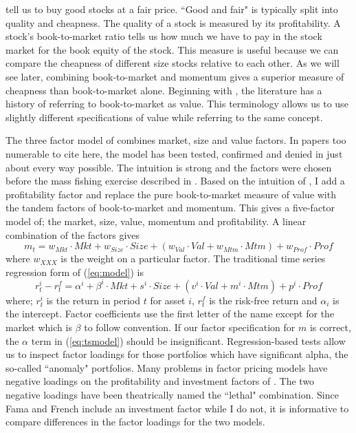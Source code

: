\textcite{graham1934security} tell us to buy good stocks at a fair price.
``Good and fair" is typically split into quality and cheapness.
The quality of a stock is measured by its profitability.
A stock's book-to-market ratio tells us how much we have to pay in the stock 
market for the book equity of the stock.
This measure is useful because we can compare the cheapness of 
different size stocks relative to each other.
As we will see later, combining book-to-market and momentum gives a superior 
measure of cheapness than book-to-market alone.
Beginning with \textcite{fama1992cross}, the literature has a history of 
referring to book-to-market as value.
This terminology allows us to use slightly different specifications of 
value while referring to the same concept.

The three factor model of \textcite{fama1993common} combines market, size and
value factors.
In papers too numerable to cite here, the model has been tested, confirmed and
denied in just about every way possible.
The intuition is strong and the factors were chosen before the mass fishing 
exercise described in \textcite{harvey2016and}.
Based on the intuition of \textcite{graham1934security}, I add a profitability 
factor and replace the pure book-to-market measure of
value with the tandem factors of book-to-market and momentum.
This gives a five-factor model of; the market, size, value, momentum and
profitability. A linear combination of the factors gives
\begin{equation}
\label{eq:model}
m_t= w_{Mkt} \cdot Mkt + w_{Size} \cdot Size +
\left( w_{Val} \cdot Val + w_{Mtm} \cdot Mtm \right) + 
w_{Prof} \cdot Prof
\end{equation}
where $w_{XXX}$ is the weight on a particular factor.
The traditional time series regression form of (\ref{eq:model}) is
\begin{equation}
\label{eq:tsmodel}
r_t^i - r_t^f= \alpha^i + \beta^i \cdot Mkt + s^i \cdot Size +
\left( v^i \cdot Val + m^i \cdot Mtm \right) +
p^i \cdot Prof
\end{equation}
where; $r_t^i$ is the return in period $t$ for asset $i$, $r_t^f$ is the 
risk-free return and $\alpha_i$ is the intercept.
Factor coefficients use the first letter of the name except for the market 
which is $\beta$ to follow convention.
If our factor specification for $m$ is correct, the $\alpha$ term in 
(\ref{eq:tsmodel}) should be insignificant.
Regression-based tests allow us to inspect factor loadings for those 
portfolios which have significant alpha, the so-called ``anomaly" portfolios.
Many problems in factor pricing models have negative loadings on the 
profitability and investment factors of \textcite{fama2016dissecting}.
The two negative loadings have been theatrically named the ``lethal" 
combination.
Since Fama and French include an investment factor while I do 
not, it is informative to compare differences in the factor loadings for the 
two models.


